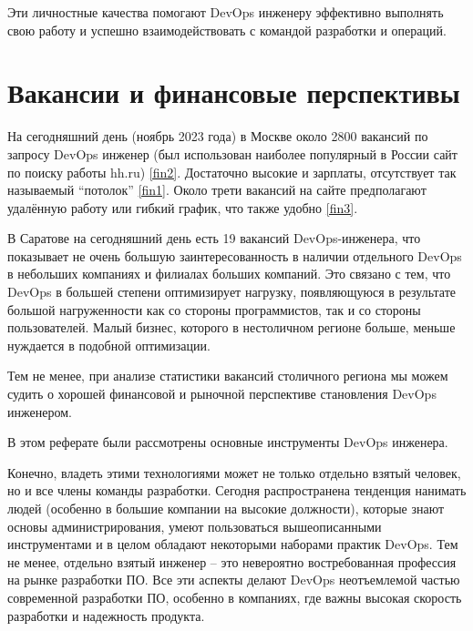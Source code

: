 \documentclass[referat]{SCWorks}
\begin{document}
Эти личностные качества помогают DevOps инженеру эффективно выполнять свою работу и успешно взаимодействовать с командой разработки и операций.

\section{Вакансии и финансовые перспективы}

На сегодняшний день (ноябрь 2023 года) в Москве около 2800 вакансий по запросу DevOps инженер (был использован наиболее популярный в России сайт по поиску работы hh.ru) \ref{fin2}. Достаточно высокие и зарплаты, отсутствует так называемый ``потолок'' \ref{fin1}. Около трети вакансий на сайте предполагают удалённую работу или гибкий график, что также удобно \ref{fin3}.

В Саратове на сегодняшний день есть 19 вакансий DevOps-инженера, что показывает не очень большую заинтересованность в наличии отдельного DevOps в небольших компаниях и филиалах больших компаний. Это связано с тем, что DevOps в большей степени оптимизирует нагрузку, появляющуюся в результате большой нагруженности как со стороны программистов, так и со стороны пользователей. Малый бизнес, которого в нестоличном регионе больше, меньше нуждается в подобной оптимизации.

Тем не менее, при анализе статистики вакансий столичного региона мы можем судить о хорошей финансовой и рыночной перспективе становления DevOps инженером.


\conclusion

В этом реферате были рассмотрены основные инструменты DevOps инженера. 

Конечно, владеть этими технологиями может не только отдельно взятый человек, но и все члены команды разработки. Сегодня распространена тенденция нанимать людей (особенно в большие компании на высокие должности), которые знают основы администрирования, умеют пользоваться вышеописанными инструментами и в целом обладают некоторыми наборами практик DevOps. Тем не менее, отдельно взятый инженер -- это невероятно востребованная профессия на рынке разработки ПО.
Все эти аспекты делают DevOps неотъемлемой частью современной разработки ПО, особенно в компаниях, где важны высокая скорость разработки и надежность продукта.

%
\end{document}

